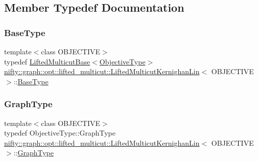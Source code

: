 \subsection{Member Typedef Documentation}
\mbox{\label{classnifty_1_1graph_1_1opt_1_1lifted__multicut_1_1LiftedMulticutKernighanLin_a6f0d8b3e69c0ee70c3241eda595ae4d2}} 
\subsubsection{\texorpdfstring{Base\+Type}{BaseType}}
{\footnotesize\ttfamily template$<$class O\+B\+J\+E\+C\+T\+I\+VE$>$ \\
typedef \hyperlink{classnifty_1_1graph_1_1opt_1_1lifted__multicut_1_1LiftedMulticutBase}{Lifted\+Multicut\+Base}$<$\hyperlink{classnifty_1_1graph_1_1opt_1_1lifted__multicut_1_1LiftedMulticutKernighanLin_ace1226557a9d65b35b09e1e38b11b0b3}{Objective\+Type}$>$ \hyperlink{classnifty_1_1graph_1_1opt_1_1lifted__multicut_1_1LiftedMulticutKernighanLin}{nifty\+::graph\+::opt\+::lifted\+\_\+multicut\+::\+Lifted\+Multicut\+Kernighan\+Lin}$<$ O\+B\+J\+E\+C\+T\+I\+VE $>$\+::\hyperlink{classnifty_1_1graph_1_1opt_1_1lifted__multicut_1_1LiftedMulticutKernighanLin_a6f0d8b3e69c0ee70c3241eda595ae4d2}{Base\+Type}}

\mbox{\label{classnifty_1_1graph_1_1opt_1_1lifted__multicut_1_1LiftedMulticutKernighanLin_a869bf835246678727ca04aacef156c20}} 
\subsubsection{\texorpdfstring{Graph\+Type}{GraphType}}
{\footnotesize\ttfamily template$<$class O\+B\+J\+E\+C\+T\+I\+VE$>$ \\
typedef Objective\+Type\+::\+Graph\+Type \hyperlink{classnifty_1_1graph_1_1opt_1_1lifted__multicut_1_1LiftedMulticutKernighanLin}{nifty\+::graph\+::opt\+::lifted\+\_\+multicut\+::\+Lifted\+Multicut\+Kernighan\+Lin}$<$ O\+B\+J\+E\+C\+T\+I\+VE $>$\+::\hyperlink{classnifty_1_1graph_1_1opt_1_1lifted__multicut_1_1LiftedMulticutKernighanLin_a869bf835246678727ca04aacef156c20}{Graph\+Type}}

